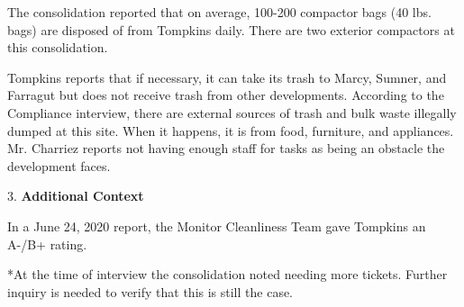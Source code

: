 The consolidation reported that on average, 100-200 compactor bags (40 lbs. bags) are disposed of from Tompkins daily. There are two exterior compactors at this consolidation.

Tompkins reports that if necessary, it can take its trash to Marcy, Sumner, and Farragut but does not receive trash from other developments. According to the Compliance interview, there are external sources of trash and bulk waste illegally dumped at this site. When it happens, it is from food, furniture, and appliances. Mr. Charriez reports not having enough staff for tasks as being an obstacle the development faces. 

3. \textbf{Additional Context} 

In a June 24, 2020 report, the Monitor Cleanliness Team gave Tompkins an A-/B+ rating. 

*At the time of interview the consolidation noted needing more tickets. Further inquiry is needed to verify that this is still the case.